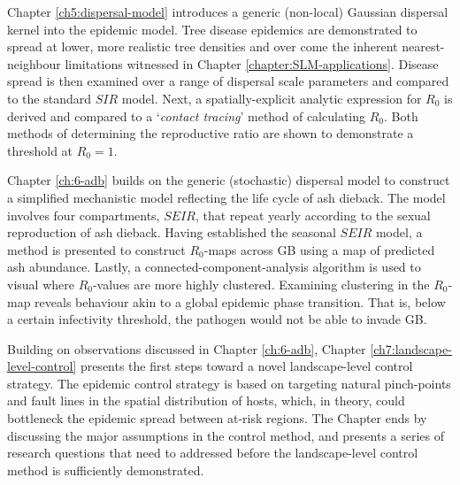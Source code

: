 Chapter \ref{ch5:dispersal-model} introduces a generic (non-local) Gaussian dispersal kernel into the epidemic model. 
Tree disease epidemics are demonstrated to spread at lower, more realistic tree densities and over come the inherent 
nearest-neighbour limitations witnessed in Chapter \ref{chapter:SLM-applications}. 
Disease spread is then examined over a range of dispersal scale parameters and compared to the standard $SIR$ model.
Next, a spatially-explicit analytic expression for $R_0$ is derived and compared to a `\textit{contact tracing}' method of calculating $R_0$.
Both methods of determining the reproductive ratio are shown to demonstrate a threshold at $R_0=1$.

Chapter \ref{ch:6-adb} builds on the generic (stochastic) dispersal model to construct a simplified mechanistic model 
reflecting the life cycle of ash dieback. The model involves four compartments, $SEIR$, that repeat yearly according to 
the sexual reproduction of ash dieback. Having established the seasonal $SEIR$ model, a method is presented to 
construct $R_0$-maps across GB using a map of predicted ash abundance. Lastly, a connected-component-analysis algorithm is used
to visual where $R_0$-values are more highly clustered. Examining clustering in the $R_0$-map reveals behaviour
akin to a global epidemic phase transition. That is, below a certain infectivity threshold, the pathogen would not be able to invade GB.

Building on observations discussed in Chapter \ref{ch:6-adb}, Chapter \ref{ch7:landscape-level-control} presents the first steps toward a novel
landscape-level control strategy. The epidemic control strategy is based on targeting natural
pinch-points and fault lines in the spatial distribution of hosts, which, in theory, could bottleneck the epidemic spread
between at-risk regions. The Chapter ends by discussing the major assumptions in the control method, and presents a series of research questions that need 
to addressed before the landscape-level control method is sufficiently demonstrated.